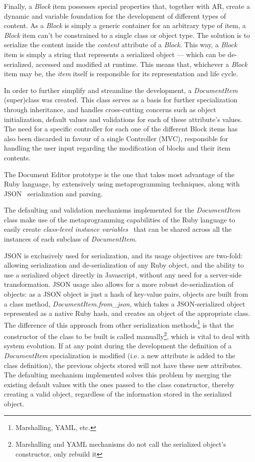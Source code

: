 Finally, a \emph{Block} item possesses special properties that, together with AR, create a dynamic and variable foundation for the development of different types of content. As a \emph{Block} is simply a generic container for an arbitrary type of item, a \emph{Block} item can't be constrained to a single class or object type. The solution is to serialize the content inside the \emph{content} attribute of a \emph{Block}. This way, a \emph{Block} item is simply a string that represents a serialized object --- which can be de-serialized, accessed and modified at runtime. This means that, whichever a \emph{Block} item may be, the \emph{item} itself is responsible for its representation and life cycle.

In order to further simplify and streamline the development, a \emph{DocumentItem} (super)class was created. This class serves as a basis for further specialization through inheritance, and handles cross-cutting concerns such as object initialization, default values and validations for each of these attribute's values. The need for a specific controller for each one of the different Block items has also been discarded in favour of a single Controller (MVC), responsible for handling the user input regarding the modification of blocks and their item contents.

The Document Editor prototype is the one that takes most advantage of the Ruby language, by extensively using metaprogramming techniques, along with JSON~\cite{rfc4627} serialization and parsing.

The defaulting and validation mechanisms implemented for the \emph{DocumentItem} class make use of the metaprogramming capabilities of the Ruby language to easily create \emph{class-level instance variables}~\cite{class_level_instance_variables} that can be shared across all the instances of each subclass of \emph{DocumentItem}.

JSON is exclusively used for serialization, and its usage objectives are two-fold: allowing serialization and de-serialization of any Ruby object, and the ability to use a serialized object directly in Javascript, without any need for a server-side transformation. JSON usage also allows for a more robust de-serialization of objects: as a JSON object is just a hash of key-value pairs, objects are built from a class method, \emph{DocumentItem.from\_json}, which takes a JSON-serialized object represented as a native Ruby hash, and creates an object of the appropriate class. The difference of this approach from other serialization methods\footnote{Marshalling, YAML, etc.} is that the constructor of the class to be built is called manually\footnote{Marshalling and YAML mechanisms do not call the serialized object's constructor, only rebuild it}, which is vital to deal with system evolution. If at any point during the development the definition of a \emph{DocumentItem} specialization is modified (i.e. a new attribute is added to the class definition), the previous objects stored will not have these new attributes. The defaulting mechanism implemented solves this problem by merging the existing default values with the ones passed to the class constructor, thereby creating a valid object, regardless of the information stored in the serialized object.

